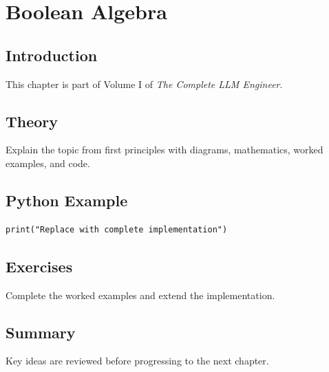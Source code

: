 \chapter{Boolean Algebra}
\label{chap:boolean-algebra}



\section{Introduction}
This chapter is part of Volume I of \emph{The Complete LLM Engineer}.

\section{Theory}
Explain the topic from first principles with diagrams, mathematics, worked examples,
and code.

\section{Python Example}
\begin{lstlisting}
print("Replace with complete implementation")
\end{lstlisting}

\section{Exercises}
\begin{exercise}
Complete the worked examples and extend the implementation.
\end{exercise}

\section{Summary}
Key ideas are reviewed before progressing to the next chapter.
